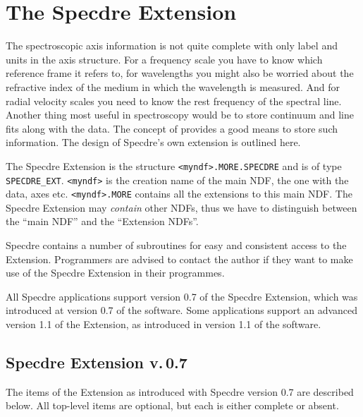 
\section{\label{extension}The Specdre Extension}

   The spectroscopic axis information is not quite complete with only
   label and units in the axis structure. For a frequency scale you have
   to know which reference frame it refers to, for wavelengths you might
   also be worried about the refractive index of the medium in which the
   wavelength is measured. And for radial velocity scales you need to
   know the rest frequency of the spectral line. Another thing most
   useful in spectroscopy would be to store continuum and line fits
   along with the data. The concept of
   provides a
   good means to store such information. The design of Specdre's own
   extension is outlined here.

   The Specdre Extension is the structure {\tt <myndf>.MORE.SPECDRE} and
   is of type {\tt SPECDRE\_EXT}. {\tt <myndf>} is the creation name of
   the main NDF, the one with the data, axes etc. {\tt <myndf>.MORE}
   contains all the extensions to this main NDF. The Specdre Extension
   may {\it contain} other NDFs, thus we have to distinguish between the
   ``main NDF'' and the ``Extension NDFs''.

   Specdre contains a number of subroutines for easy and consistent
   access to the Extension. Programmers are advised to contact the
   author if they want to make use of the Specdre Extension in their
   programmes.

   All Specdre applications support version 0.7 of the Specdre
   Extension, which was introduced at version 0.7 of the software. Some
   applications support an advanced version 1.1 of the Extension, as
   introduced in version 1.1 of the software.


\subsection{Specdre Extension v.\,0.7}

   The items of the Extension as introduced with Specdre version 0.7 are
   described below. All top-level items are optional, but each is either
   complete or absent.

